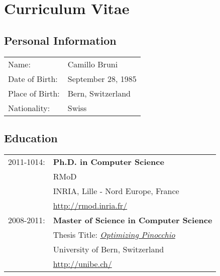 
\chapter*{Curriculum Vitae}

\section*{Personal Information}
\begin{tabular}{ll}
	Name:           & Camillo Bruni \\
	Date of Birth:  & September 28, 1985 \\
	Place of Birth: & Bern, Switzerland \\
	Nationality:    & Swiss
\end{tabular}

\section*{Education}

\begin{tabular}{ll}
	2011-1014: & \textbf{Ph.D. in Computer Science} \\
	           & RMoD \\
	           & INRIA, Lille - Nord Europe, France \\
	           & \url{http://rmod.inria.fr/} \\
	2008-2011: & \textbf{Master of Science in Computer Science} \\
	           & Thesis Title: \href{http://scg.unibe.ch/archive/masters/Brun11a.pdf}{\emph{Optimizing Pinocchio}} \\
	           & University of Bern, Switzerland \\
	           & \url{http://unibe.ch/}
\end{tabular}

